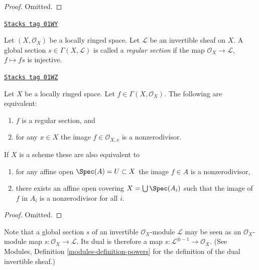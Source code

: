 \begin{proof}
Omitted.
\end{proof}

\begin{definition}
\label{divisors-definition-regular-section}
\href{https://stacks.math.columbia.edu/tag/01WY}{\texttt{Stacks tag 01WY}}

Let $(X, \mathcal{O}_X)$ be a locally ringed space.
Let $\mathcal{L}$ be an invertible sheaf on $X$.
A global section $s \in \Gamma(X, \mathcal{L})$ is called a
{\it regular section} if the map $\mathcal{O}_X \to \mathcal{L}$,
$f \mapsto fs$ is injective.
\end{definition}

\begin{lemma}
\label{divisors-lemma-regular-section-structure-sheaf}
\href{https://stacks.math.columbia.edu/tag/01WZ}{\texttt{Stacks tag 01WZ}}

Let $X$ be a locally ringed space. Let $f \in \Gamma(X, \mathcal{O}_X)$.
The following are equivalent:
\begin{enumerate}
\item $f$ is a regular section, and
\item for any $x \in X$ the image $f \in \mathcal{O}_{X, x}$
is a nonzerodivisor.
\end{enumerate}
If $X$ is a scheme these are also equivalent to
\begin{enumerate}
\item[(3)] for any affine open $\Spec(A) = U \subset X$
the image $f \in A$ is a nonzerodivisor,
\item[(4)] there exists an affine open covering
$X = \bigcup \Spec(A_i)$ such that
the image of $f$ in $A_i$ is a nonzerodivisor for all $i$.
\end{enumerate}
\end{lemma}

\begin{proof}
Omitted.
\end{proof}

Note that a global section $s$ of an invertible $\mathcal{O}_X$-module
$\mathcal{L}$ may be seen as an $\mathcal{O}_X$-module map
$s : \mathcal{O}_X \to \mathcal{L}$. Its dual is therefore a
map $s : \mathcal{L}^{\otimes -1} \to \mathcal{O}_X$.
(See Modules, Definition \ref{modules-definition-powers}
for the definition of the dual invertible sheaf.)

